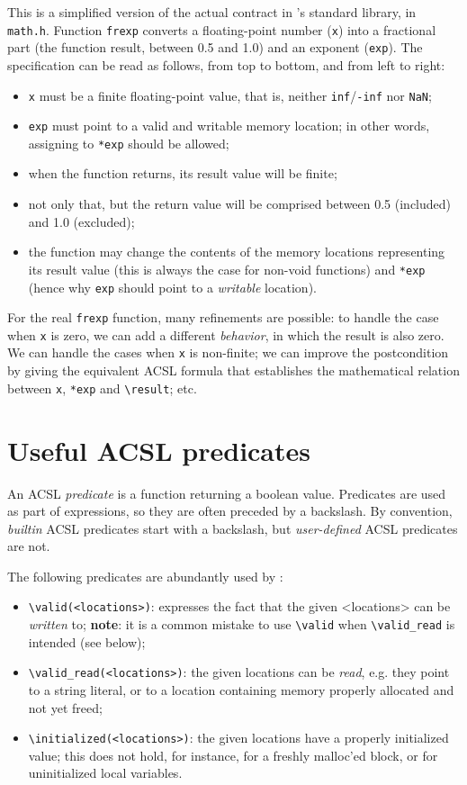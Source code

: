 \documentclass{frama-c-book}
\begin{document}
This is a simplified version of the actual contract in \FramaC's standard
library, in \texttt{math.h}. Function \texttt{frexp} converts a floating-point
number (\texttt{x}) into a fractional part (the function result, between
0.5 and 1.0) and an exponent (\texttt{exp}).
The specification can be read as follows, from top to bottom, and from left
to right:
\begin{itemize}
\item \texttt{x} must be a finite floating-point value, that is, neither
  \texttt{inf}/\texttt{-inf} nor \texttt{NaN};
\item \texttt{exp} must point to a valid and writable memory location;
  in other words, assigning to \texttt{*exp} should be allowed;
\item when the function returns, its result value will be finite;
\item not only that, but the return value will be comprised between
  0.5 (included) and 1.0 (excluded);
\item the function may change the contents of the memory locations representing
  its result value (this is always the case for non-void functions) and
  \texttt{*exp} (hence why \texttt{exp} should point to a {\em writable}
  location).
\end{itemize}

For the real \texttt{frexp} function, many refinements are possible: to handle
the case when \texttt{x} is zero, we can add a different {\em behavior},
in which the result is also zero. We can handle the cases when \texttt{x} is
non-finite; we can improve the postcondition by giving the equivalent ACSL
formula that establishes the mathematical relation between \texttt{x},
\texttt{*exp} and \verb+\result+; etc.

\section{Useful ACSL predicates}

An ACSL {\em predicate} is a function returning a boolean value.
Predicates are used as part of expressions, so they are often preceded
by a backslash. By convention, {\em builtin} ACSL predicates start with
a backslash, but {\em user-defined} ACSL predicates are not.

The following predicates are abundantly used by \Eva{}:
\begin{itemize}
\item \verb+\valid(<locations>)+: expresses the fact that
  the given <locations> can be {\em written} to; \textbf{note}: it is
  a common mistake to use \verb+\valid+ when \verb+\valid_read+ is intended
  (see below);
\item \verb+\valid_read(<locations>)+: the given locations can be {\em read},
  e.g. they point to a string literal, or to a location containing memory
  properly allocated and not yet freed;
\item \verb+\initialized(<locations>)+: the given locations have a properly
  initialized value; this does not hold, for instance, for a freshly
  malloc'ed block, or for uninitialized local variables.

\end{itemize}
\end{document}
